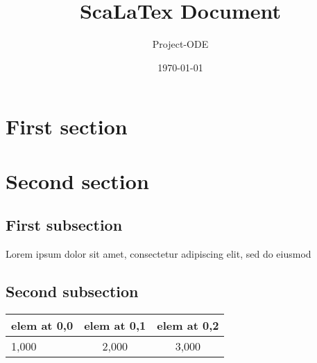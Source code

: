 \documentclass{report}
\title{ScaLaTex Document}
\date{\today}
\author{Project-ODE}
\begin{document}
\maketitle

    \section{First section}
    
    \section{Second section}
    
        \subsection{First subsection}
        
            Lorem ipsum dolor sit amet, consectetur adipiscing elit, sed do eiusmod

        \subsection{Second subsection}
        
            \begin{tabular}{|l|cc}
            
                elem at 0,0 & elem at 0,1 & elem at 0,2\\
                \hline
                1,000 & 2,000 & 3,000\\
            
            \end{tabular}
\end{document}
